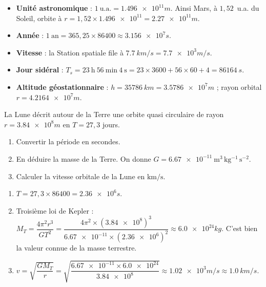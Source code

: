 \documentclass[11pt]{article}
\begin{document}
\begin{exemplebox}
\begin{itemize}
\item \textbf{Unité astronomique} : $1~\text{u.a.} = \num{1,496e11}{m}$. Ainsi Mars, à $1,52$~u.a. du Soleil, orbite à $r = 1,52 \times \num{1,496e11} = \num{2,27e11}{m}$.
\item \textbf{Année} : $1~\text{an} = 365,25 \times 86400 \approx \num{3,156e7}{s}$.
\item \textbf{Vitesse} : la Station spatiale file à $\SI{7,7}{km/s} = \num{7,7e3}{m/s}$.
\item \textbf{Jour sidéral} : $T_s = 23~\text{h}~56~\text{min}~4~\text{s} = 23 \times 3600 + 56 \times 60 + 4 = \SI{86164}{s}$.
\item \textbf{Altitude géostationnaire} : $h = \SI{35786}{km} = \num{3,5786e7}{m}$ ; rayon orbital $r = \num{4,2164e7}{m}$.
\end{itemize}
\end{exemplebox}

\begin{exercice}
La Lune décrit autour de la Terre une orbite quasi circulaire de rayon $r = \num{3,84e8}{m}$ en $T = 27,3$ jours.
\begin{enumerate}
\item Convertir la période en secondes.
\item En déduire la masse de la Terre. On donne $G = \num{6,67e-11}~\mathrm{m^3\,kg^{-1}\,s^{-2}}$.
\item Calculer la vitesse orbitale de la Lune en $\mathrm{km/s}$.
\end{enumerate}
\end{exercice}

\begin{corrige}
\begin{enumerate}
\item $T = 27,3 \times 86400 = \num{2,36e6}{s}$.
\item Troisième loi de Kepler : $M_T = \dfrac{4\pi^2 r^3}{G T^2} = \dfrac{4\pi^2 \times (\num{3,84e8})^3}{\num{6,67e-11} \times (\num{2,36e6})^2} \approx \num{6,0e24}{kg}$. C'est bien la valeur connue de la masse terrestre.
\item $v = \sqrt{\dfrac{GM_T}{r}} = \sqrt{\dfrac{\num{6,67e-11} \times \num{6,0e24}}{\num{3,84e8}}} \approx \num{1,02e3}{m/s} \approx \SI{1,0}{km/s}$.
\end{enumerate}
\end{corrige}
\end{document}
